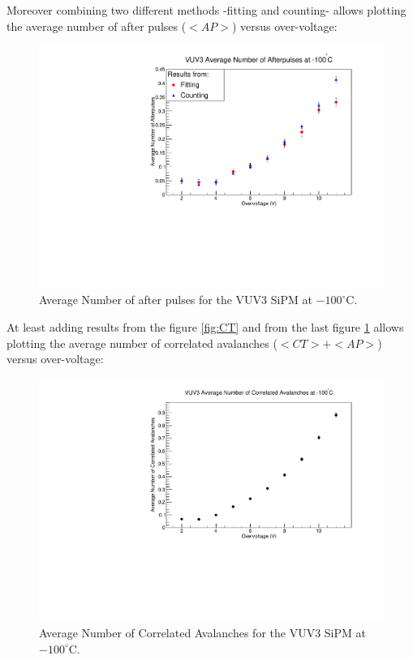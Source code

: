 \documentclass[a4paper, 11pt]{report}%
\begin{document}
  Moreover combining two different methods -fitting and counting- allows plotting the average number of after pulses ($<AP>$) versus over-voltage:
    
  \begin{figure}[!hbtp]
    \centering
    \includegraphics[totalheight=0.55\textwidth,trim=.5cm 0cm 1.8cm 0.9cm, clip=true]{../Pictures/VUV3_AP2_vs_OV.pdf}
    \caption{Average Number of after pulses for the VUV3 SiPM at $-100^{\circ}$C.}
    \label{fig:AP}
  \end{figure}
  
  \newpage
  
  At least adding results from the figure \ref{fig:CT} and from the last figure \ref{fig:AP} allows plotting the average number of correlated 
  avalanches ($<CT> + <AP>$) versus over-voltage:

  \begin{figure}[!hbtp]
    \centering
    \includegraphics[totalheight=0.55\textwidth,trim=.5cm 0cm 1.8cm 0.9cm, clip=true]{../Pictures/VUV3_CA_vs_OV.pdf}
    \caption{Average Number of Correlated Avalanches for the VUV3 SiPM at $-100^{\circ}$C.}
    \label{fig:CA}
  \end{figure}
  
\end{document}

